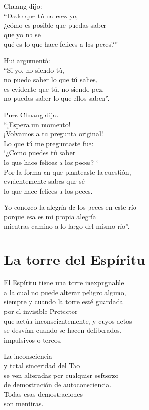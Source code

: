 \documentclass[hidelinks]{memoir}
\begin{document}
	Chuang dijo:\\
	``Dado que tú no eres yo,\\
	¿cómo es posible que puedas saber\\
	que yo no sé\\
	qué es lo que hace felices a los peces?''
	
	Hui argumentó:\\
	``Si yo, no siendo tú,\\
	no puedo saber lo que tú sabes,\\
	es evidente que tú, no siendo pez,\\
	no puedes saber lo que ellos saben''.
	
	Pues Chuang dijo:\\
	``¡Espera un momento!\\
	¡Volvamos a tu pregunta original!\\
	Lo que tú me preguntaste fue:\\
	`¿Como puedes tú saber\\
	lo que hace felices a los peces? `\\
	Por la forma en que planteaste la cuestión,\\
	evidentemente sabes que sé\\
	lo que hace felices a los peces.
	
	Yo conozco la alegría de los peces en este río\\
	porque esa es mi propia alegría\\
	mientras camino a lo largo del mismo río''.
	
	\chapter*{La torre del Espíritu}
	
	El Espíritu tiene una torre inexpugnable\\
	a la cual no puede alterar peligro alguno,\\
	siempre y cuando la torre esté guardada\\
	por el invisible Protector\\
	que actúa inconscientemente, y cuyos actos\\
	se desvían cuando se hacen deliberados,\\
	impulsivos o tercos.
	
	La inconsciencia\\
	y total sinceridad del Tao\\
	se ven alteradas por cualquier esfuerzo\\
	de demostración de autoconsciencia.\\
	Todas esas demostraciones\\
	son mentiras.
	
\end{document}
